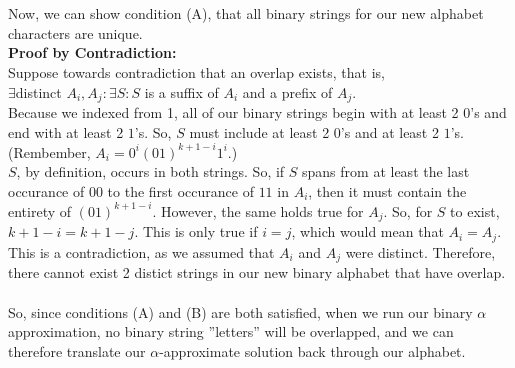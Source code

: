 \documentclass[12pt]{article}
\begin{document}
\begin{itemize}
\\
\\Now, we can show condition (A), that all binary strings for our new alphabet characters are unique.
\\\textbf{Proof by Contradiction:}
\\Suppose towards contradiction that an overlap exists, that is,
\\$\exists $distinct $A_i,A_j:\exists S : S $ is a suffix of $A_i$ and a prefix of $A_j$.
\\Because we indexed from 1, all of our binary strings begin with at least 2 $0$'s and end with at least 2 $1$'s. So, $S$ must include at least 2 $0$'s and at least 2 $1$'s. (Rembember, $A_i = 0^i(01)^{k+1-i}1^i$.)
\\$S$, by definition, occurs in both strings. So, if $S$ spans from at least the last occurance of $00$ to the first occurance of $11$ in $A_i$, then it must contain the entirety of $(01)^{k+1-i}$. However, the same holds true for $A_j$. So, for $S$ to exist, $k+1-i = k+1-j$. This is only true if $i=j$, which would mean that $A_i=A_j$. This is a contradiction, as we assumed that $A_i$ and $A_j$ were distinct. Therefore, there cannot exist 2 distict strings in our new binary alphabet that have overlap.
\\
\\So, since conditions (A) and (B) are both satisfied, when we run our binary $\alpha$ approximation, no binary string ''letters'' will be overlapped, and we can therefore translate our $\alpha$-approximate solution back through our alphabet.


\end{itemize}
\end{document}
